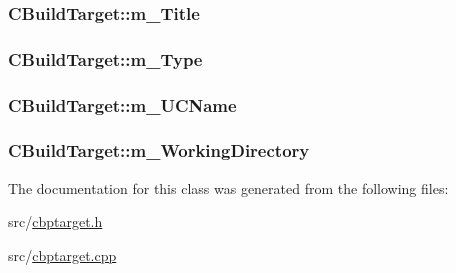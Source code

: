\hypertarget{classCBuildTarget_abd914af1350302b3cc592cf391d7f4a6}{
\subsubsection[{m\-\_\-\-Title}]{ C\-Build\-Target\-::m\-\_\-\-Title\hspace{0.3cm}{\ttfamily [private]}}}\label{classCBuildTarget_abd914af1350302b3cc592cf391d7f4a6}
\hypertarget{classCBuildTarget_abdb459bba568451a5e97ff1974ab37d9}{
\subsubsection[{m\-\_\-\-Type}]{ C\-Build\-Target\-::m\-\_\-\-Type\hspace{0.3cm}{\ttfamily [private]}}}\label{classCBuildTarget_abdb459bba568451a5e97ff1974ab37d9}
\hypertarget{classCBuildTarget_ab3da058a427da4e7a16f138d35150b62}{
\subsubsection[{m\-\_\-\-U\-C\-Name}]{ C\-Build\-Target\-::m\-\_\-\-U\-C\-Name\hspace{0.3cm}{\ttfamily [private]}}}\label{classCBuildTarget_ab3da058a427da4e7a16f138d35150b62}
\hypertarget{classCBuildTarget_afbb0bbec05f775062ba32c59560d3e52}{
\subsubsection[{m\-\_\-\-Working\-Directory}]{ C\-Build\-Target\-::m\-\_\-\-Working\-Directory\hspace{0.3cm}{\ttfamily [private]}}}\label{classCBuildTarget_afbb0bbec05f775062ba32c59560d3e52}


The documentation for this class was generated from the following files\-:\begin{DoxyCompactItemize}
\item 
src/\hyperlink{cbptarget_8h}{cbptarget.\-h}\item 
src/\hyperlink{cbptarget_8cpp}{cbptarget.\-cpp}\end{DoxyCompactItemize}
